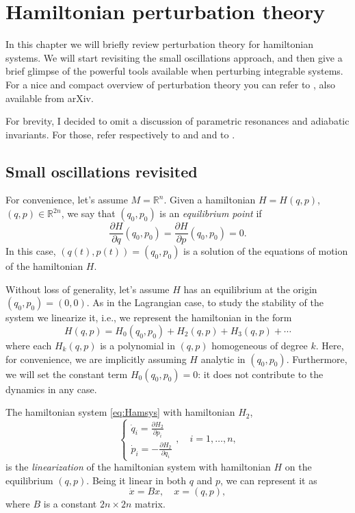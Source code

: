 \documentclass[english,fontsize=11pt,paper=a5,oneside]{scrbook}
\newcommand{\R}{\mathbb{R}}
\theoremstyle{definition}
\begin{document}
\chapter{Hamiltonian perturbation theory}

In this chapter we will briefly review perturbation theory for hamiltonian systems.
We will start revisiting the small oscillations approach, and then give a brief glimpse of the powerful tools available when perturbing integrable systems.
For a nice and compact overview of perturbation theory you can refer to \cite{Celletti_2009}, also available from arXiv.

For brevity, I decided to omit a discussion of parametric resonances and adiabatic invariants.
For those, refer respectively to \cite[Chapter 25]{book:arnold} and \cite[Chapter 5.4]{book:knauf} and to \cite[Chapter 15.1]{book:knauf}.

\section{Small oscillations revisited}
For convenience, let's assume $M=\R^n$.
Given a hamiltonian $H=H(q,p)$, $(q,p)\in\R^{2n}$, we say that $(q_0, p_0)$ is an \emph{equilibrium point} if
\begin{equation}
  \frac{\partial H}{\partial q}(q_0, p_0) = \frac{\partial H}{\partial p}(q_0, p_0) = 0.
\end{equation}
In this case, $(q(t), p(t)) = (q_0, p_0)$ is a solution of the equations of motion of the hamiltonian $H$.

Without loss of generality, let's assume $H$ has an equilibrium at the origin $(q_0, p_0) = (0,0)$.
As in the Lagrangian case, to study the stability of the system we linearize it, i.e., we represent the hamiltonian in the form
\begin{equation}\label{eq:hamidevl}
  H(q,p) = H_0(q_0,p_0) + H_2(q,p) + H_3(q,p) + \cdots
\end{equation}
where each $H_k(q,p)$ is a polynomial in $(q,p)$ homogeneous of degree $k$.
Here, for convenience, we are implicitly assuming $H$ analytic in $(q_0,p_0)$.
Furthermore, we will set the constant term $H_0(q_0,p_0) = 0$: it does not contribute to the dynamics in any case.

The hamiltonian system \eqref{eq:Hamsys} with hamiltonian $H_2$,
\begin{equation}\label{eq:lienarizedH}
  \left\lbrace
  \begin{aligned}
    \dot q_i = \frac{\partial H_2}{\partial p_i} \\
    \dot p_i = -\frac{\partial H_2}{\partial q_i}
  \end{aligned}
  \right .,\quad i=1,\ldots,n,
\end{equation}
is the \emph{linearization} of the hamiltonian system with hamiltonian $H$ on the equilibrium $(q,p)$.
Being it linear in both $q$ and $p$, we can represent it as
\begin{equation}\label{eq:hamsoivp}
  \dot x = B x,\quad x =(q,p),
\end{equation}
where $B$ is a constant $2n\times2n$ matrix.
\end{document}
